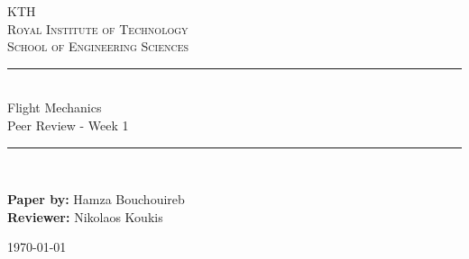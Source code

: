 \newcommand{\horrule}[1]{\rule{\linewidth}{#1}} %

\begin{titlepage}

\begin{center}
\normalfont \normalsize 
\textsc{KTH}\\
\textsc{Royal Institute of Technology} \\  %
\textsc{School of Engineering Sciences} \\ [25pt] %
\horrule{0.5pt} \\[0.4cm] %
\huge Flight Mechanics \vspace{5mm}\\ Peer Review - Week 1 \\ %
\horrule{2pt} \\[0.5cm] %
\vspace*{10mm}
\end{center}

\normalfont \normalsize
\begin{flushleft}
\textbf{Paper by:} Hamza Bouchouireb\\
\textbf{Reviewer:} Nikolaos Koukis\\
\end{flushleft}

\vfill
\begin{center}
    \today
\end{center}
\end{titlepage}
